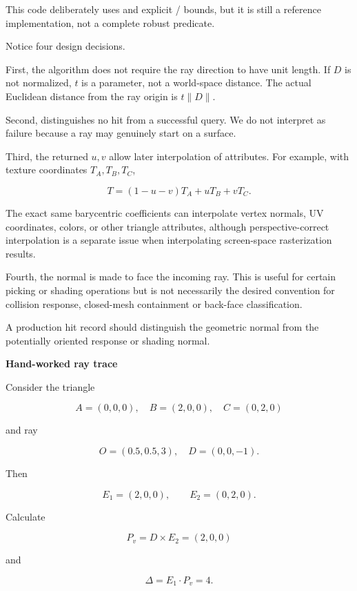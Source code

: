 This code deliberately uses  and explicit / bounds, but it is still a reference implementation, not a complete robust predicate.

Notice four design decisions.

First, the algorithm does not require the ray direction to have unit length. If \(D\) is not normalized, \(t\) is a parameter, not a world-space distance. The actual Euclidean distance from the ray origin is \(t\|D\|\).

Second,  distinguishes no hit from a successful query. We do not interpret  as failure because a ray may genuinely start on a surface.

Third, the returned \(u,v\) allow later interpolation of attributes. For example, with texture coordinates \(T_A,T_B,T_C\),

\[
T=(1-u-v)T_A+uT_B+vT_C.
\]

The exact same barycentric coefficients can interpolate vertex normals, UV coordinates, colors, or other triangle attributes, although perspective-correct interpolation is a separate issue when interpolating screen-space rasterization results.

Fourth, the normal is made to face the incoming ray. This is useful for certain picking or shading operations but is not necessarily the desired convention for collision response, closed-mesh containment or back-face classification.

A production hit record should distinguish the geometric normal from the potentially oriented response or shading normal.

\textbf{Hand-worked ray trace}

Consider the triangle

\[
A=(0,0,0),\quad B=(2,0,0),\quad C=(0,2,0)
\]

and ray

\[
O=(0.5,0.5,3),\quad D=(0,0,-1).
\]

Then

\[
E_1=(2,0,0),\qquad E_2=(0,2,0).
\]

Calculate

\[
P_v=D\times E_2=(2,0,0)
\]

and

\[
\Delta=E_1\cdot P_v=4.
\]

